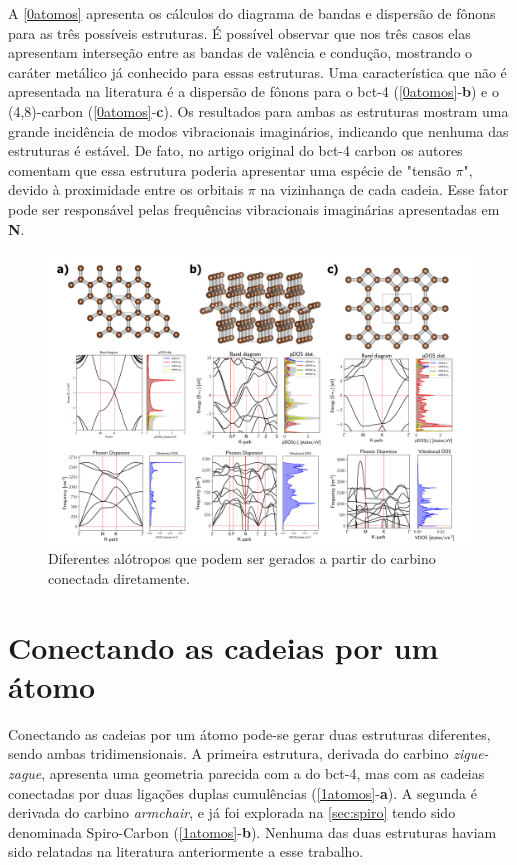 		A \autoref{0atomos} apresenta os cálculos do diagrama de bandas e dispersão de fônons para as três possíveis estruturas. É possível observar que nos três casos elas apresentam interseção entre as bandas de valência e condução, mostrando o caráter metálico já conhecido para essas estruturas. Uma característica que não é apresentada na literatura é a dispersão de fônons para o bct-4 (\autoref{0atomos}-\textbf{b}) e o (4,8)-carbon (\autoref{0atomos}-\textbf{c}). Os resultados para ambas as estruturas mostram uma grande incidência de modos vibracionais imaginários, indicando que nenhuma das estruturas é estável. De fato, no artigo original do bct-4 carbon os autores comentam que essa estrutura poderia apresentar uma espécie de "tensão $\pi$", devido à proximidade entre os orbitais $\pi$ na vizinhança de cada cadeia. Esse fator pode ser responsável pelas frequências vibracionais imaginárias apresentadas em \textbf{N}.
		
		\begin{figure}[!ht]
			\centering
			\includegraphics[width=1.\linewidth]{capitulos/fig/results3/0atoms}
			\caption{Diferentes alótropos que podem ser gerados a partir do carbino conectada diretamente.}
			\label{0atomos}
		\end{figure}
		
	\section{Conectando as cadeias por um átomo}
		
		Conectando as cadeias por um átomo pode-se gerar duas estruturas diferentes, sendo ambas tridimensionais. A primeira estrutura, derivada do carbino \textit{zigue-zague}, apresenta uma geometria parecida com a do bct-4, mas com as cadeias conectadas por duas ligações duplas cumulências (\autoref{1atomos}-\textbf{a}). A segunda é derivada do carbino \textit{armchair}, e já foi explorada na \autoref{sec:spiro} tendo sido denominada Spiro-Carbon (\autoref{1atomos}-\textbf{b}). Nenhuma das duas estruturas haviam sido relatadas na literatura anteriormente a esse trabalho. 
		
